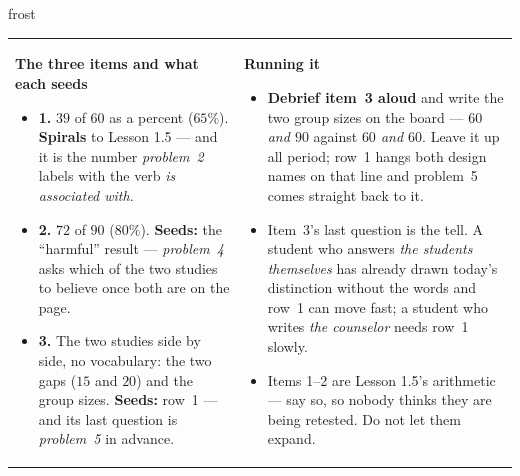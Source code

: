 \documentclass[10pt]{article}
\begin{document}
\begin{fixedskillbox}{frost}
\begin{tabularx}{\linewidth}{@{}X X@{}}
\begin{minipage}[t]{\linewidth}\vspace{0pt}
    \textbf{The three items and what each seeds}
    \begin{itemize}[leftmargin=1.1em, itemsep=1pt, topsep=2pt]
      \item \textbf{1.} $39$ of $60$ as a percent ($65\%$). \textbf{Spirals} to Lesson 1.5 ---
            and it is the number \emph{problem~2} labels with the verb \emph{is associated
            with}.
      \item \textbf{2.} $72$ of $90$ ($80\%$). \textbf{Seeds:} the ``harmful'' result ---
            \emph{problem~4} asks which of the two studies to believe once both are on the
            page.
      \item \textbf{3.} The two studies side by side, no vocabulary: the two gaps ($15$ and
            $20$) and the group sizes. \textbf{Seeds:} row~1 --- and its last question is
            \emph{problem~5} in advance.
    \end{itemize}
\end{minipage}
&
\begin{minipage}[t]{\linewidth}\vspace{0pt}
    \textbf{Running it}
    \begin{itemize}[leftmargin=1.1em, itemsep=1pt, topsep=2pt]
      \item \textbf{Debrief item~3 aloud} and write the two group sizes on the board ---
            \emph{$60$ and $90$} against \emph{$60$ and $60$}. Leave it up all period; row~1
            hangs both design names on that line and problem~5 comes straight back to it.
      \item Item~3's last question is the tell. A student who answers \emph{the students
            themselves} has already drawn today's distinction without the words and row~1 can
            move fast; a student who writes \emph{the counselor} needs row~1 slowly.
      \item Items 1--2 are Lesson 1.5's arithmetic --- say so, so nobody thinks they are being
            retested. Do not let them expand.
    \end{itemize}
\end{minipage}
\end{tabularx}
\end{fixedskillbox}
\end{document}
